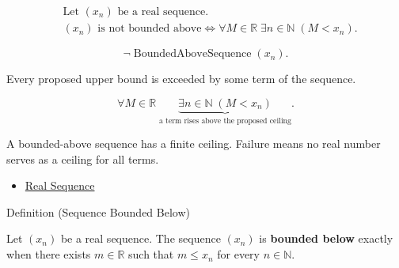 \begin{remark*}
\[
\begin{aligned}
&\text{Let } (x_n) \text{ be a real sequence.}\\
&(x_n) \text{ is not bounded above}
\Longleftrightarrow
\forall M \in \mathbb{R}\;
\exists n \in \mathbb{N}\;(M < x_n).
\end{aligned}
\]
\end{remark*}

\begin{remark*}
\[
\neg\operatorname{BoundedAboveSequence}(x_n).
\]
\end{remark*}

\begin{remark*}
Every proposed upper bound is exceeded by some term of the sequence.
\end{remark*}

\begin{remark*}
\[
\forall M \in \mathbb{R}\;
\underbrace{\exists n \in \mathbb{N}\;(M < x_n)}
_{\text{a term rises above the proposed ceiling}}.
\]
\end{remark*}

\begin{remark*}[Interpretation]
A bounded-above sequence has a finite ceiling. Failure means no real number
serves as a ceiling for all terms.
\end{remark*}

\begin{dependencies}
\begin{itemize}
  \item \hyperref[def:real-sequence]{Real Sequence}
\end{itemize}
\end{dependencies}


\begin{definitionbox}{Definition (Sequence Bounded Below)}
\begin{definition}
\label{def:sequence-bounded-below}
Let $(x_n)$ be a real sequence. The sequence $(x_n)$ is
\textbf{bounded below} exactly when there exists $m \in \mathbb{R}$ such
that $m \le x_n$ for every $n \in \mathbb{N}$.
\end{definition}
\end{definitionbox}

